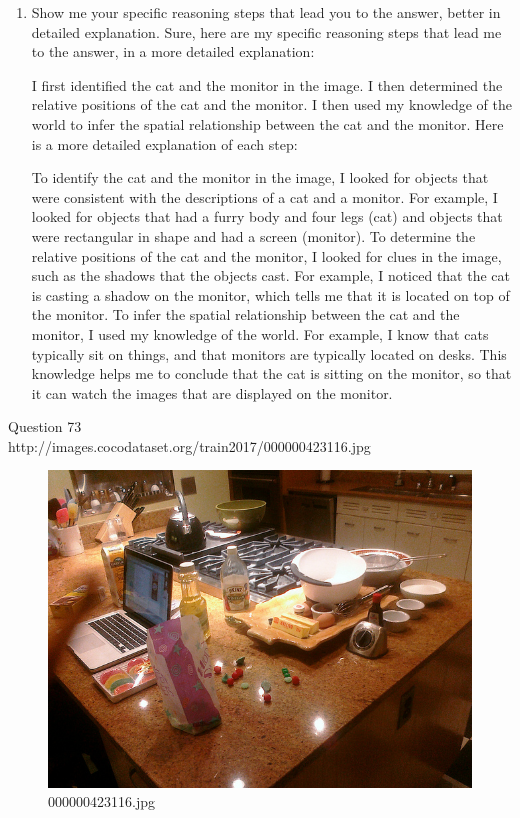 \begin{enumerate}
    Here are some additional details about the spatial relationship between the cat and the monitor:
    
    The cat is a small, furry mammal that is typically found in homes and other domesticated environments.
    The monitor is a device that displays electronic images.
    The cat is sitting on the monitor, meaning that it is resting on the monitor.
    The monitor is under the cat, meaning that it is sheltered from the elements by the cat.
    I hope this is helpful! Let me know if you have other questions or request
    \item Show me your specific reasoning steps that lead you to the answer, better in detailed explanation.
    \subitem 
    Sure, here are my specific reasoning steps that lead me to the answer, in a more detailed explanation:
    
    I first identified the cat and the monitor in the image.
    I then determined the relative positions of the cat and the monitor.
    I then used my knowledge of the world to infer the spatial relationship between the cat and the monitor.
    Here is a more detailed explanation of each step:
    
    To identify the cat and the monitor in the image, I looked for objects that were consistent with the descriptions of a cat and a monitor. For example, I looked for objects that had a furry body and four legs (cat) and objects that were rectangular in shape and had a screen (monitor).
    To determine the relative positions of the cat and the monitor, I looked for clues in the image, such as the shadows that the objects cast. For example, I noticed that the cat is casting a shadow on the monitor, which tells me that it is located on top of the monitor.
    To infer the spatial relationship between the cat and the monitor, I used my knowledge of the world. For example, I know that cats typically sit on things, and that monitors are typically located on desks. This knowledge helps me to conclude that the cat is sitting on the monitor, so that it can watch the images that are displayed on the monitor.
\end{enumerate}
Question 73\\
http://images.cocodataset.org/train2017/000000423116.jpg
\begin{figure}[h]
    \centering
    \includegraphics[width=0.8\linewidth]{../image set/hard/000000423116.jpg}
    \caption{000000423116.jpg}
\end{figure}
